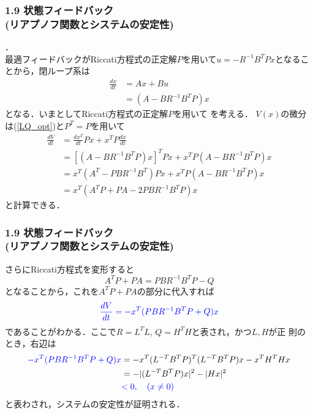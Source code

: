 \begin{frame}[t]
\frametitle{1.9 状態フィードバック \\ (リアプノフ関数とシステムの安定性)}
．\\
最適フィードバックがRiccati方程式の正定解$P$を用いて$u = -R^{-1} B^T P x$となることから，閉ループ系は
\begin{align}
 \frac{dx}{dt} &= Ax + B u \nonumber \\
               &= (A - B R^{-1} B^T P)x
 \label{LQ_opt}
\end{align}
となる．いまとしてRiccati方程式の正定解$P$を用いて
を考える．
$V(x)$の微分は(\ref{LQ_opt})と$P^T = P$を用いて
\begin{align}
 \frac{d V}{dt}
  &= \frac{d x^T}{dt} P x + x^T P \frac{dx}{dt} \nonumber \\
 &= [(A - B R^{-1} B^T P)x]^T Px + x^T P (A - B R^{-1} B^T P)x \nonumber \\
 &= x^T (A^T - P B R^{-1} B^T ) P x + x^T P (A - B R^{-1} B^T P)x \nonumber \\
 &= x^T (A^T P + P A - 2P B R^{-1} B^T P) x
\end{align}
と計算できる．
\end{frame}


\begin{frame}[t]
\frametitle{1.9 状態フィードバック \\ (リアプノフ関数とシステムの安定性)}
さらにRiccati方程式を変形すると
\begin{equation}
 A^T P + P A = P B R^{-1} B^T P - Q
\end{equation}
となることから，これを$A^T P + P A$の部分に代入すれば
\begin{equation}
 \textcolor{blue}{\frac{dV}{dt} = - x^T (P B R^{-1} B^T P + Q) x}
\end{equation}
であることがわかる．ここで$R = L^T L$, $Q = H^T H$と表され，かつ$L, H$が正
則のとき，右辺は
\begin{align}
 \textcolor{blue}{- x^T (P B R^{-1} B^T P + Q) x }
  &= - x^T (L^{-T} B^T P)^T (L^{-T} B^T P) x -   x^T H^T H x \nonumber \\
  &= - |(L^{-T} B^T P) x|^2 -  |H x|^2 \nonumber \\
 &\textcolor{blue}{< 0, \quad (x \neq 0)}
\end{align}
と表わされ，システムの安定性が証明される．

\end{frame}


